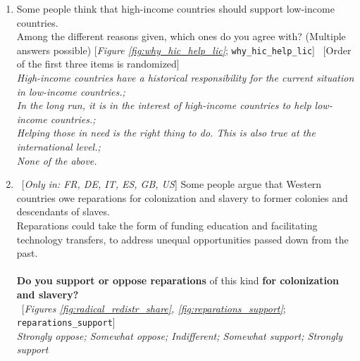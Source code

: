 \begin{enumerate}[resume]
\item  \label{q:why_hic_help_lic} Some people think that high-income countries should support low-income countries.~\\Among the different reasons given, which ones do you agree with? (Multiple answers possible) [\textit{Figure \ref{fig:why_hic_help_lic}}; 
\verb|why_hic_help_lic|]
~[Order of the first three items is randomized]
  \\ \textit{High-income countries have a historical responsibility for the current situation in low-income countries.; \\In the long run, it is in the interest of high-income countries to help low-income countries.; \\Helping those in need is the right thing to do. This is also true at the international level.; \\None of the above.}

\item ~[\textit{Only in: FR, DE, IT, ES, GB, US}] \label{q:reparations_support} Some people argue that Western countries owe reparations for colonization and slavery to former colonies and descendants of slaves. \\Reparations could take the form of funding education and facilitating technology transfers, to address unequal opportunities passed down from the past. \\\\\textbf{Do you support or oppose reparations} of this kind \textbf{for colonization and slavery?~}\\ 
~[\textit{Figures \ref{fig:radical_redistr_share}, \ref{fig:reparations_support}}; 
\verb|reparations_support|]
  \\ \textit{Strongly oppose; Somewhat oppose; Indifferent; Somewhat support; Strongly support}

\end{enumerate} 

